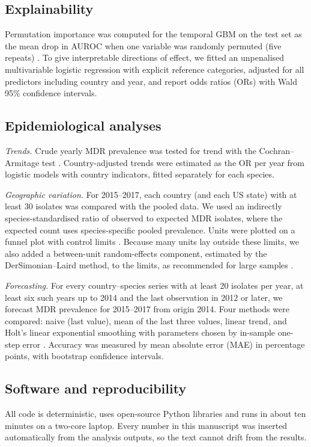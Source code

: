 \documentclass[11pt,a4paper]{article}
\begin{document}
\subsection{Explainability}
Permutation importance was computed for the temporal GBM on the test set as the mean drop in AUROC when one variable was randomly permuted (five repeats) \cite{breiman2001,fisher2019}. To give interpretable directions of effect, we fitted an unpenalised multivariable logistic regression with explicit reference categories, adjusted for all predictors including country and year, and report odds ratios (ORs) with Wald 95\% confidence intervals.

\subsection{Epidemiological analyses}
\textit{Trends.} Crude yearly MDR prevalence was tested for trend with the Cochran--Armitage test \cite{armitage1955}. Country-adjusted trends were estimated as the OR per year from logistic models with country indicators, fitted separately for each species.

\textit{Geographic variation.} For 2015--2017, each country (and each US state) with at least 30 isolates was compared with the pooled data. We used an indirectly species-standardised ratio of observed to expected MDR isolates, where the expected count uses species-specific pooled prevalence. Units were plotted on a funnel plot with control limits \cite{spiegelhalter2005}. Because many units lay outside these limits, we also added a between-unit random-effects component, estimated by the DerSimonian--Laird method, to the limits, as recommended for large samples \cite{spiegelhalter2005,dersimonian1986}.

\textit{Forecasting.} For every country--species series with at least 20 isolates per year, at least six such years up to 2014 and the last observation in 2012 or later, we forecast MDR prevalence for 2015--2017 from origin 2014. Four methods were compared: naive (last value), mean of the last three values, linear trend, and Holt's linear exponential smoothing with parameters chosen by in-sample one-step error \cite{holt2004,hyndman2021}. Accuracy was measured by mean absolute error (MAE) in percentage points, with bootstrap confidence intervals.

\subsection{Software and reproducibility}
All code is deterministic, uses open-source Python libraries and runs in about ten minutes on a two-core laptop. Every number in this manuscript was inserted automatically from the analysis outputs, so the text cannot drift from the results.
\end{document}
